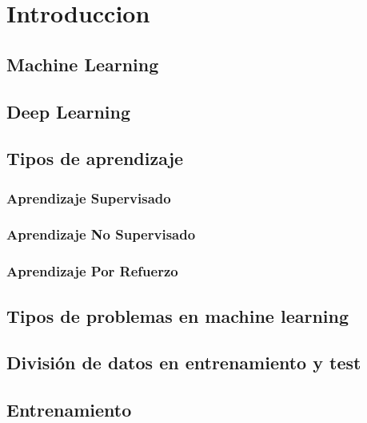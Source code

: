 \chapter{Introduccion}

\section{Machine Learning}


\section{Deep Learning}

\section{Tipos de aprendizaje}


\subsection{Aprendizaje Supervisado}



\subsection{Aprendizaje No Supervisado}


\subsection{Aprendizaje Por Refuerzo}


\section{Tipos de problemas en machine learning}


\section{División de datos en entrenamiento y test}



\section{Entrenamiento}


